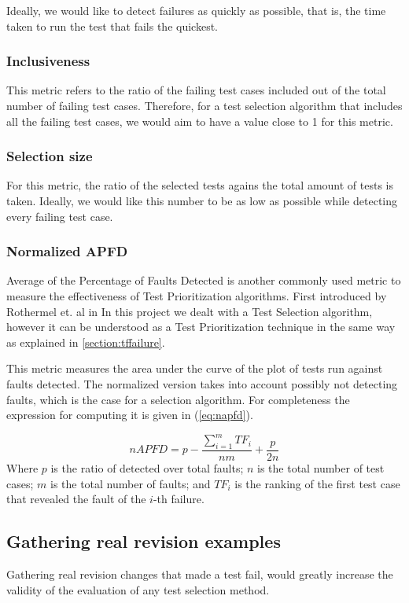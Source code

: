 \documentclass{article}
\begin{document}
Ideally, we would like to detect failures as quickly as possible, that is, the time taken to run the test that fails the quickest.
\subsubsection{Inclusiveness}
This metric refers to the ratio of the failing test cases included out of the total number of failing test cases. Therefore, for a test selection algorithm that includes all the failing test cases, we would aim to have a value close to 1 for this metric.
\subsubsection{Selection size}
For this metric, the ratio of the selected tests agains the total amount of tests is taken. Ideally, we would like this number to be as low as possible while detecting every failing test case.
\subsubsection{Normalized APFD}
Average of the Percentage of Faults Detected is another commonly used metric to measure the effectiveness of Test Prioritization algorithms. First introduced by Rothermel et. al in \cite{TODO} In this project we dealt with a Test Selection algorithm, however it can be understood as a Test Prioritization technique in the same way as explained in \ref{section:tffailure}. %

This metric measures the area under the curve of the plot of tests run against faults detected. The normalized version takes into account possibly not detecting faults, which is the case for a selection algorithm. For completeness the expression for computing it is given in (\ref{eq:napfd}).

\begin{equation}
  \label{eq:napfd}
    nAPFD = p - \frac{\sum_{i=1}^{m}TF_i}{nm}+\frac{p}{2n}
\end{equation}
Where $p$ is the ratio of detected over total faults; $n$ is the total number of test cases; $m$ is the total number of faults; and $TF_i$ is the ranking of the first test case that revealed the fault of the $i$-th failure.


\subsection{Gathering real revision examples}
Gathering real revision changes that made a test fail, would greatly increase the validity of the evaluation of any test selection method.
\end{document}
